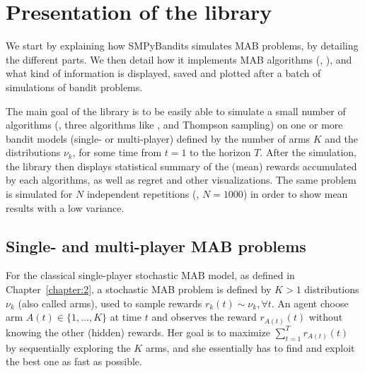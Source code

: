 \section{Presentation of the library}
\label{sec:3:presentationLibrary}


We start by explaining how SMPyBandits simulates MAB problems, by detailing the different parts.
We then detail how it implements MAB algorithms (\eg, \UCB),
and what kind of information is displayed, saved and plotted after a batch of simulations of bandit problems.

The main goal of the library is to be easily able to simulate a small number of algorithms (\eg, three algorithms like \UCB, \klUCB{} and Thompson sampling) on one or more bandit models (single- or multi-player) defined by the number of arms $K$ and the distributions $\nu_k$, for some time from $t=1$ to the horizon $T$.
After the simulation, the library then displays statistical summary of the (mean) rewards accumulated by each algorithms, as well as regret and other visualizations.
The same problem is simulated for $N$ independent repetitions (\eg, $N=1000$) in order to show mean results with a low variance.


\subsection{Single- and multi-player MAB problems}

For the classical single-player stochastic MAB model, as defined in Chapter~\ref{chapter:2},
a stochastic MAB problem is defined by $K>1$ distributions $\nu_k$ (also called arms),
used to sample \iid{} rewards $r_k(t) \sim \nu_k, \forall t$.
An agent choose arm $A(t)\in\{1,\dots,K\}$ at time $t$ and observes the reward $r_{A(t)}(t)$ without knowing the other (hidden) rewards.
Her goal is to maximize $\sum_{t=1}^T r_{A(t)}(t)$ by sequentially exploring the $K$ arms, and she essentially has to find and exploit the best one as fast as possible.

